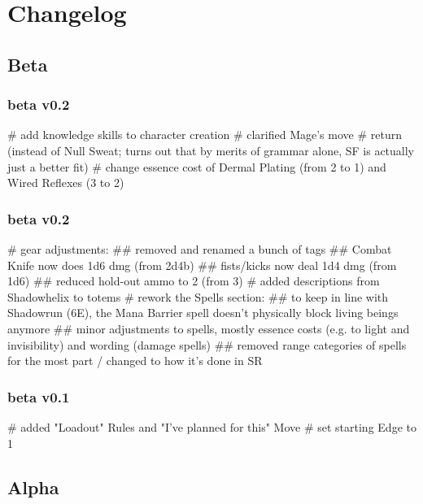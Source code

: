 \chapter{Changelog}

\section{Beta}

\subsection*{beta v0.2}
\begin{easylist}
    # add knowledge skills to character creation
    # clarified Mage's  move
    # return  (instead of Null Sweat; turns out that by merits of grammar alone, SF is actually just a better fit)
    # change essence cost of Dermal Plating (from 2 to 1) and Wired Reflexes (3 to 2)
\end{easylist}

\subsection*{beta v0.2}
\begin{easylist}
    # gear adjustments:
        ## removed and renamed a bunch of tags
        ## Combat Knife now does 1d6 dmg (from 2d4b)
        ## fists/kicks now deal 1d4 dmg (from 1d6)
        ## reduced hold-out ammo to 2 (from 3)
    # added descriptions from Shadowhelix to totems 
    # rework the Spells section:
        ## to keep in line with Shadowrun (6E), the Mana Barrier spell doesn't physically block living beings anymore
        ## minor adjustments to spells, mostly essence costs (e.g. to light and invisibility) and wording (damage spells)
        ## removed range categories of spells for the most part / changed to how it's done in SR
\end{easylist}

\subsection*{beta v0.1}
\begin{easylist}
    # added "Loadout" Rules and "I've planned for this" Move
    # set starting Edge to 1
\end{easylist}


\section{Alpha}

